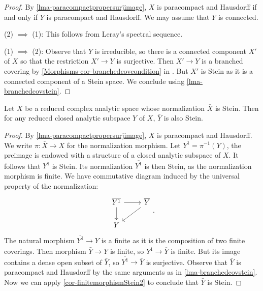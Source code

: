 \begin{proof}
    By \cref{lma-paracompactpropersurjimage}, $X$ is paracompact and Hausdorff if and only if $Y$ is paracompact and Hausdorff.
    We may assume that $Y$ is connected. 

    (2) $\implies$ (1): This follows from Leray's spectral sequence.

    (1) $\implies$ (2): Observe that $Y$ is irreducible, so there is a connected component $X'$ of $X$ so that the restriction $X'\rightarrow Y$ is surjective. Then $X'\rightarrow Y$ is a branched covering by \cref{Morphisms-cor-branchedcovcondition} in  . But $X'$ is Stein as it is a connected component of a Stein space. We conclude using \cref{lma-branchedcovstein}.
\end{proof}

\begin{lemma}\label{lma-normalizationsteinanalyticsubset}
    Let $X$ be a reduced complex analytic space whose normalization $\bar{X}$ is Stein. Then for any reduced closed analytic subspace $Y$ of $X$, $\bar{Y}$ is also Stein.
\end{lemma}
\begin{proof}
    By \cref{lma-paracompactpropersurjimage}, $X$ is paracompact and Hausdorff.
    We write $\pi:\bar{X}\rightarrow X$ for the normalization morphism. Let $Y^1=\pi^{-1}(Y)$, the preimage is endowed with a structure of a closed analytic subspace of $X$. It follows that $Y^1$ is Stein. Its normalization $\overline{Y^1}$ is then Stein, as the normalization morphism is finite. 
    We have commutative diagram induced by the universal property of the normalization:
    \[
        \begin{tikzcd}
            \overline{Y^1} \arrow[d] \arrow[r] & \overline{Y} \arrow[ld] \\
            Y                                  &                        
        \end{tikzcd}.  
    \]
    The natural morphism $\overline{Y^1}\rightarrow Y$ is a finite as it is the composition of two finite coverings. Then morphism $\bar{Y}\rightarrow Y$ is finite, so $\overline{Y^1}\rightarrow \overline{Y}$ is finite. But its image contains a dense open subset of $\bar{Y}$, so $\overline{Y^1}\rightarrow \bar{Y}$ is surjective.  
    Observe that $\bar{Y}$ is paracompact and Hausdorff by the same arguments as in \cref{lma-branchedcovstein}.
    Now we can apply \cref{cor-finitemorphismStein2} to conclude that $\bar{Y}$ is Stein.
\end{proof}

